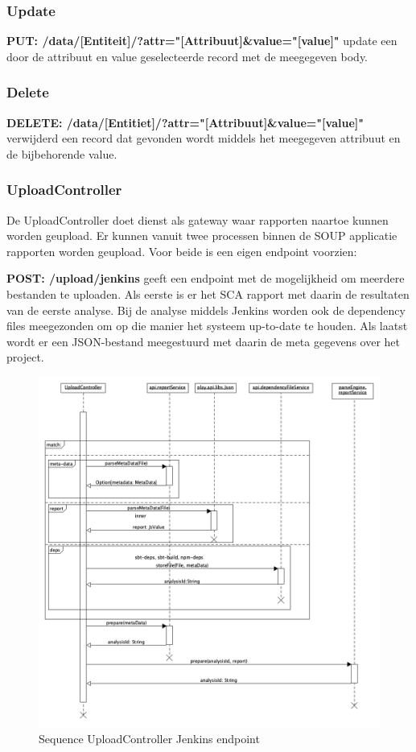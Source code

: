 \subsubsection*{Update}
\textbf{PUT: /data/[Entiteit]/?attr="[Attribuut]\&value="[value]"} update een door de attribuut en value geselecteerde record met de meegegeven body.
\subsubsection*{Delete}
\textbf{DELETE: /data/[Entitiet]/?attr="[Attribuut]\&value="[value]"} verwijderd een record dat gevonden wordt middels het meegegeven attribuut en de bijbehorende value.


\subsubsection{UploadController}\label{uploadController}
De UploadController doet dienst als gateway waar rapporten naartoe kunnen worden geupload. Er kunnen vanuit twee processen binnen de SOUP applicatie rapporten worden geupload. Voor beide is een eigen endpoint voorzien:

\textbf{POST: /upload/jenkins} geeft een endpoint met de mogelijkheid om meerdere bestanden te uploaden. Als eerste is er het SCA rapport met daarin de resultaten van de eerste analyse. Bij de analyse middels Jenkins worden ook de dependency files meegezonden om op die manier het systeem up-to-date te houden. Als laatst wordt er een JSON-bestand meegestuurd met daarin de meta gegevens over het project.

\begin{figure}[bth]
    \myfloatalign
    \includegraphics[width=12cm]{gfx/umlet/exports/SequploadController-Jenkins}
    \caption{Sequence UploadController Jenkins endpoint}
    \label{fig:SequenceUploadReportJenkins}
\end{figure}

